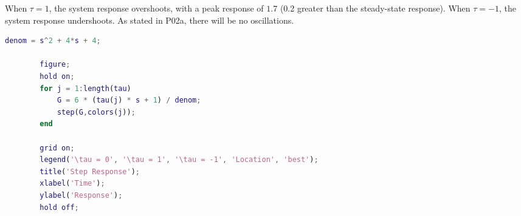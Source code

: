 \begin{hwkProblem}{2}{}
	\hwkPart{}

	When \( \tau = 1 \), the system response overshoots, with a peak response of \( 1.7 \) (0.2 greater than the steady-state response). When \( \tau = -1 \), the system response undershoots. As stated in P02a, there will be no oscillations.

	\hwkCode{}

	\begin{lstlisting}[language={matlab}, label={lst:s02}, caption={\lstinline{MATLAB} code for P02}]
		denom = s^2 + 4*s + 4;

		figure;
		hold on;
		for j = 1:length(tau)
			G = 6 * (tau(j) * s + 1) / denom;
			step(G,colors(j));
		end

		grid on;
		legend('\tau = 0', '\tau = 1', '\tau = -1', 'Location', 'best');
		title('Step Response');
		xlabel('Time');
		ylabel('Response');
		hold off;
	\end{lstlisting}

\end{hwkProblem}

